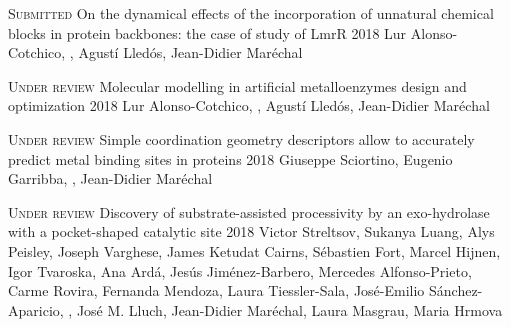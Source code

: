 

\hspace*{\fill}\bodyfontlight\footnotesize{}

\begin{cventries}

  \pubentry
    {\scshape{Submitted}} %
    {On the dynamical effects of the incorporation of unnatural chemical blocks in protein backbones: the case of study of LmrR} %
    {2018} %
    {} %
    {Lur Alonso-Cotchico, , Agustí Lledós, Jean-Didier Maréchal} %
    {} %
    {} %

  \pubentry
    {\scshape{Under review}} %
    {Molecular modelling in artificial metalloenzymes design and optimization} %
    {2018} %
    {} %
    {Lur Alonso-Cotchico, , Agustí Lledós, Jean-Didier Maréchal} %
    {} %
    {} %

  \pubentry
    {\scshape{Under review}} %
    {Simple coordination geometry descriptors allow to accurately predict metal binding sites in proteins} %
    {2018} %
    {} %
    {Giuseppe Sciortino, Eugenio Garribba, ,\textsuperscript{\dagger} Jean-Didier Maréchal\textsuperscript{\dagger}} %
    {} %
    {} %

  \pubentry
    {\scshape{Under review}} %
    {Discovery of substrate-assisted processivity by an exo-hydrolase with a pocket-shaped catalytic site} %
    {2018} %
    {} %
    {Victor Streltsov, Sukanya Luang, Alys Peisley, Joseph Varghese, James Ketudat Cairns, Sébastien Fort, Marcel Hijnen, Igor Tvaroska, Ana Ardá, Jesús Jiménez-Barbero, Mercedes Alfonso-Prieto, Carme Rovira, Fernanda Mendoza, Laura Tiessler-Sala, José-Emilio Sánchez-Aparicio, , José M. Lluch, Jean-Didier Maréchal, Laura Masgrau, Maria Hrmova} %
    {} %
    {} %


\end{cventries}
